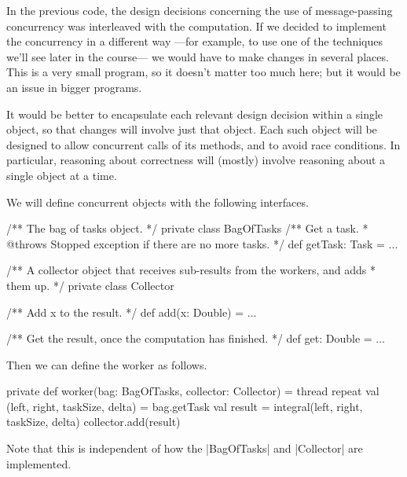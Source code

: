 
\begin{slide}

In the previous code, the design decisions concerning the use of
message-passing concurrency was interleaved with the computation.  If
we decided to implement the concurrency in a different way ---for
example, to use one of the techniques we'll see later in the course---
we would have to make changes in several places.  This is a very small
program, so it doesn't matter too much here; but it would be an issue
in bigger programs.

It would be better to encapsulate each relevant design decision within a
single object, so that changes will involve just that object.  Each such
object will be designed to allow concurrent calls of its methods, and to avoid
race conditions.  In particular, reasoning about correctness will (mostly)
involve reasoning about a single object at a time. 
\end{slide}


\begin{slide}

We will define concurrent objects with the following interfaces.
%
\begin{scala}
  /** The bag of tasks object. */
  private class BagOfTasks{
    /** Get a task.  
      * @throws Stopped exception if there are no more tasks. */
    def getTask: Task = ...
  }  

  /** A collector object that receives sub-results from the workers, and adds
    * them up. */
  private class Collector{
    /** Add x to the result. */
    def add(x: Double) = ...

    /** Get the result, once the computation has finished. */
    def get: Double = ...
  }
\end{scala}
\end{slide}


\begin{slide}

Then we can define the worker as follows. 
%
\begin{scala}
  private def worker(bag: BagOfTasks, collector: Collector) = thread{
    repeat{
      val (left, right, taskSize, delta) = bag.getTask
      val result = integral(left, right, taskSize, delta)
      collector.add(result)
    }
  }
\end{scala}
%
Note that this is independent of how the |BagOfTasks| and |Collector| are
implemented. 
\end{slide}

